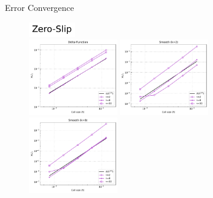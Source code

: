 \documentclass[10pt,aspectratio=169]{beamer}
\begin{document}
\begin{frame}[fragile]{Error Convergence}
	\begin{figure}
		
		\includegraphics[width=2cm]{../Annulus_Benchmark_Kramer/benchmark_figs/label_Zero-Slip.pdf}
		\vspace{-0.15in}
		\begin{multicols}{3}
			\includegraphics[width=3.85cm]{../Annulus_Benchmark_Kramer/benchmark_figs/case3_k_0_vel_err_conv_vel_penalty_2.5e+08_stokes_tol_1.0e-10.pdf}\par
			\hspace{-0.08in}
			\includegraphics[width=3.85cm]{../Annulus_Benchmark_Kramer/benchmark_figs/case4_k_2_vel_err_conv_vel_penalty_2.5e+08_stokes_tol_1.0e-10.pdf}\par
			\hspace{-0.12in}
			\includegraphics[width=3.85cm]{../Annulus_Benchmark_Kramer/benchmark_figs/case4_k_8_vel_err_conv_vel_penalty_2.5e+08_stokes_tol_1.0e-10.pdf}
		\end{multicols}
		
		\vspace{-0.3in}
		

\end{figure}
\end{frame}
\end{document}
